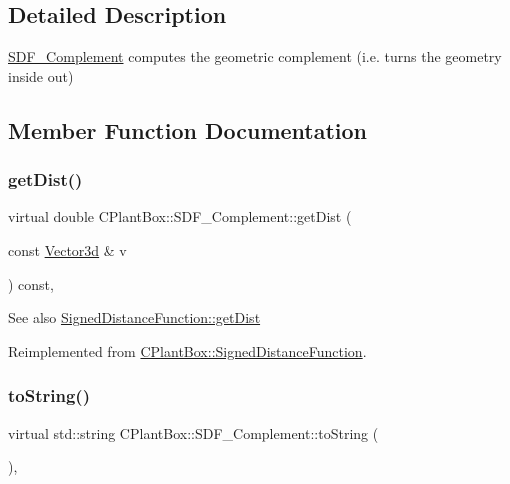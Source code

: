 \subsection{Detailed Description}
\hyperlink{classCPlantBox_1_1SDF__Complement}{S\+D\+F\+\_\+\+Complement} computes the geometric complement (i.\+e. turns the geometry inside out) 

\subsection{Member Function Documentation}
\mbox{\label{classCPlantBox_1_1SDF__Complement_a1f4d756f312a7ea6b208396a5a72e6a9}} 
\subsubsection{\texorpdfstring{get\+Dist()}{getDist()}}
{\footnotesize\ttfamily virtual double C\+Plant\+Box\+::\+S\+D\+F\+\_\+\+Complement\+::get\+Dist (\begin{DoxyParamCaption}\item[{const \hyperlink{classCPlantBox_1_1Vector3d}{Vector3d} \&}]{v }\end{DoxyParamCaption}) const\hspace{0.3cm}{\ttfamily [inline]}, {\ttfamily [virtual]}}

\begin{DoxySeeAlso}{See also}
\hyperlink{classCPlantBox_1_1SignedDistanceFunction_a8e58237574af3673906bba84d5d14ee8}{Signed\+Distance\+Function\+::get\+Dist} 
\end{DoxySeeAlso}


Reimplemented from \hyperlink{classCPlantBox_1_1SignedDistanceFunction_a8e58237574af3673906bba84d5d14ee8}{C\+Plant\+Box\+::\+Signed\+Distance\+Function}.

\mbox{\label{classCPlantBox_1_1SDF__Complement_a8950e40cf4d3d81877205b4051186135}} 
\subsubsection{\texorpdfstring{to\+String()}{toString()}}
{\footnotesize\ttfamily virtual std\+::string C\+Plant\+Box\+::\+S\+D\+F\+\_\+\+Complement\+::to\+String (\begin{DoxyParamCaption}{ }\end{DoxyParamCaption})\hspace{0.3cm}{\ttfamily [inline]}, {\ttfamily [virtual]}}

